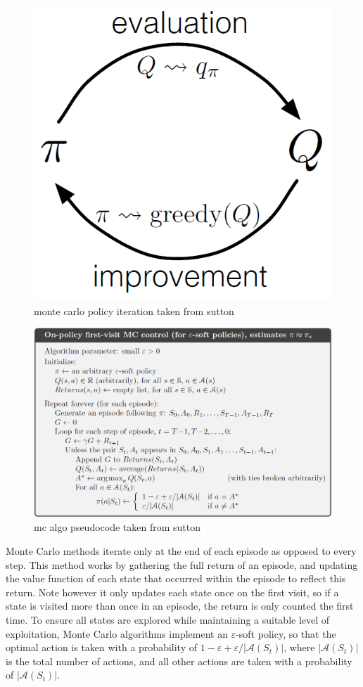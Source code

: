 \begin{figure}
\vspace{-.6cm}
\includegraphics[width=.25\textwidth]{images/gpimc}
\caption[monte carlo policy iteration]{monte carlo policy iteration taken from sutton}
\label{fig:gpimc}
\end{figure}

\begin{figure}[h]
\includegraphics[width=\textwidth]{images/onpolicymc}
\caption[mc algorithm pseudocode]{mc algo pseudocode taken from sutton}
\label{fig:mcsuttonpseudo}
\end{figure}

Monte Carlo methods iterate only at the end of each episode as opposed to every step. This method works by gathering the full return of an episode, and updating the value function of each state that occurred within the episode to reflect this return. Note however it only updates each state once on the first visit, so if a state is visited more than once in an episode, the return is only counted the first time. To ensure all states are explored while maintaining a suitable level of exploitation, Monte Carlo algorithms implement an $\varepsilon$-soft policy, so that the optimal action is taken with a probability of $1-\varepsilon+\varepsilon/|\mathscr{A}\left(S_t\right)|$, where $|\mathscr{A}\left(S_t\right)|$ is the total number of actions, and all other actions are taken with a probability of $|\mathscr{A}\left(S_t\right)|$.

